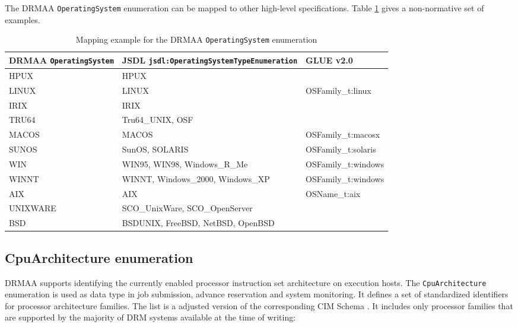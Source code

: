 \documentclass{article}
\newcommand{\h}[1]{\lstinline|#1|}
\begin{document}
The DRMAA \h{OperatingSystem} enumeration can be mapped to other high-level specifications. Table \ref{tab:osmappings} gives a non-normative set of examples.

\begin{table}[ht]
\centering
\begin{tabularx}{\textwidth}{|l|X|l|}
\hline
DRMAA \h{OperatingSystem} & JSDL \h{jsdl:OperatingSystemTypeEnumeration} & GLUE v2.0 \\
\hline
HPUX	&	HPUX & \\
LINUX	& 	LINUX  & OSFamily\_t:linux \\
IRIX	&	IRIX &  \\
TRU64 	&	Tru64\_UNIX, OSF & \\
MACOS 	&	MACOS & OSFamily\_t:macosx \\
SUNOS 	&	SunOS, SOLARIS & OSFamily\_t:solaris \\
WIN 	&	WIN95, WIN98, Windows\_R\_Me & OSFamily\_t:windows \\
WINNT 	&	WINNT, Windows\_2000, Windows\_XP & OSFamily\_t:windows \\
AIX 	&	AIX  &  OSName\_t:aix \\
UNIXWARE &	SCO\_UnixWare, SCO\_OpenServer & \\
BSD 	&	BSDUNIX, FreeBSD, NetBSD, OpenBSD & \\
\hline
\end{tabularx}
\caption{Mapping example for the DRMAA \h{OperatingSystem} enumeration}
\label{tab:osmappings}
\end{table}

\subsection{CpuArchitecture enumeration}
\label{sec:cpuarchs}

DRMAA supports identifying the currently enabled processor instruction set architecture on execution hosts. The \h{CpuArchitecture} enumeration is used as data type in job submission, advance reservation and system monitoring. It defines a set of standardized identifiers for processor architecture families. The list is a adjusted version of the corresponding CIM Schema \cite{cim}. It includes only processor families that are supported by the majority of DRM systems available at the time of writing:


\end{document}
